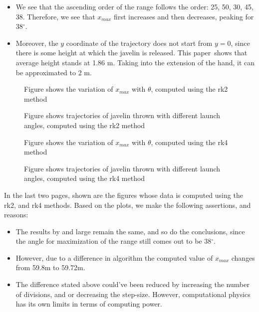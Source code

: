 \documentclass[12pt]{article}
\begin{document}
\begin{itemize}
    \item We see that the ascending order of the range follows the order: 25, 50, 30, 45, 38. Therefore, we see that $x_{max}$ first increases and then decreases, peaking for 38$^\circ$.
    \item Moreover, the $y$ coordinate of the trajectory does not start from $y = 0$, since there is some height at which the javelin is released. This paper\,\cite{ref10} shows that average height stands at 1.86 m. Taking into the extension of the hand, it can be approximated to 2 m.
\end{itemize}
\newpage
\begin{figure}[H]
    \centering
    \scalebox{0.85}{}
    \caption{Figure shows the variation of $x_{max}$ with $\theta$, computed using the rk2 method}
    \label{fig:my_label3}
\end{figure}
\begin{figure}[H]
    \centering
    \scalebox{0.85}{}
    \caption{Figure shows trajectories of javelin thrown with different launch angles, computed using the rk2 method}
    \label{fig:my_label4}
\end{figure}
\begin{figure}[H]
    \centering
    \scalebox{0.85}{}
    \caption{Figure shows the variation of $x_{max}$ with $\theta$, computed using the rk4 method}
    \label{fig:my_label5}
\end{figure}
\begin{figure}[H]
    \centering
    \scalebox{0.85}{}
    \caption{Figure shows trajectories of javelin thrown with different launch angles, computed using the rk4 method}
    \label{fig:my_label6}
\end{figure}
\newpage
In the last two pages, shown are the figures whose data is computed using the rk2, and rk4 methods. Based on the plots, we make the following assertions, and reasons:
\begin{itemize}
    \item The results by and large remain the same, and so do the conclusions, since the angle for maximization of the range still comes out to be 38$^\circ$.
    \item However, due to a difference in algorithm the computed value of $x_{max}$ changes from 59.8m to 59.72m. 
    \item The difference stated above could've been reduced by increasing the number of divisions, and or decreasing the step-size. However, computational physics has its own limits in terms of computing power.
\end{itemize}
\newpage
\end{document}
